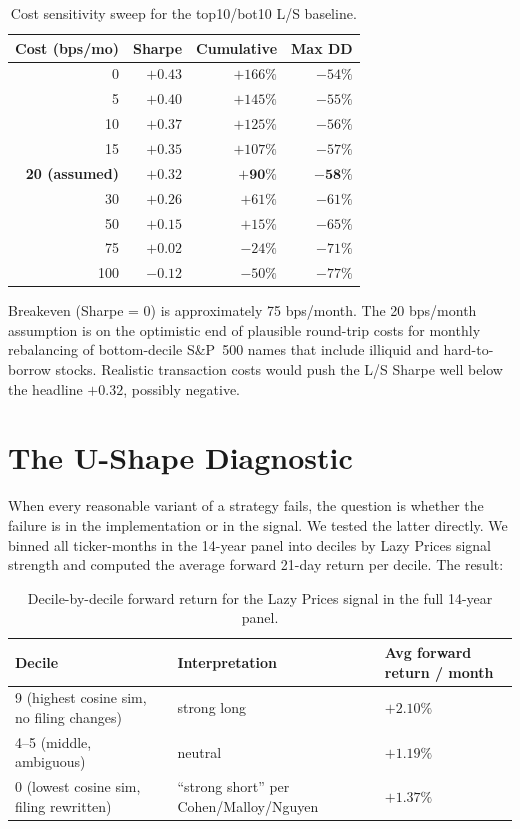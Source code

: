 \documentclass[11pt,a4paper]{article}
\begin{document}
\begin{table}[H]
\centering
\caption{Cost sensitivity sweep for the top10/bot10 L/S baseline.}
\label{tab:costs}
\begin{tabular}{rrrr}
\toprule
Cost (bps/mo) & Sharpe & Cumulative & Max DD \\
\midrule
0   & $+0.43$ & $+166\%$ & $-54\%$ \\
5   & $+0.40$ & $+145\%$ & $-55\%$ \\
10  & $+0.37$ & $+125\%$ & $-56\%$ \\
15  & $+0.35$ & $+107\%$ & $-57\%$ \\
\textbf{20 (assumed)} & $\mathbf{+0.32}$ & $\mathbf{+90\%}$ & $\mathbf{-58\%}$ \\
30  & $+0.26$ & $+61\%$ & $-61\%$ \\
50  & $+0.15$ & $+15\%$ & $-65\%$ \\
75  & $+0.02$ & $-24\%$ & $-71\%$ \\
100 & $-0.12$ & $-50\%$ & $-77\%$ \\
\bottomrule
\end{tabular}
\end{table}

Breakeven (Sharpe = 0) is approximately 75 bps/month. The 20 bps/month assumption is on the optimistic end of plausible round-trip costs for monthly rebalancing of bottom-decile S\&P~500 names that include illiquid and hard-to-borrow stocks. Realistic transaction costs would push the L/S Sharpe well below the headline $+0.32$, possibly negative.

\section{The U-Shape Diagnostic}
\label{sec:ushape}

When every reasonable variant of a strategy fails, the question is whether the failure is in the implementation or in the signal. We tested the latter directly. We binned all ticker-months in the 14-year panel into deciles by Lazy Prices signal strength and computed the average forward 21-day return per decile. The result:

\begin{table}[H]
\centering
\caption{Decile-by-decile forward return for the Lazy Prices signal in the full 14-year panel.}
\label{tab:ushape}
\begin{tabular}{lll}
\toprule
Decile & Interpretation & Avg forward return / month \\
\midrule
9 (highest cosine sim, no filing changes) & strong long & $\mathbf{+2.10\%}$ \\
4--5 (middle, ambiguous) & neutral & $+1.19\%$ \\
0 (lowest cosine sim, filing rewritten) & ``strong short'' per Cohen/Malloy/Nguyen & $+1.37\%$ \\
\bottomrule
\end{tabular}
\end{table}
\end{document}
